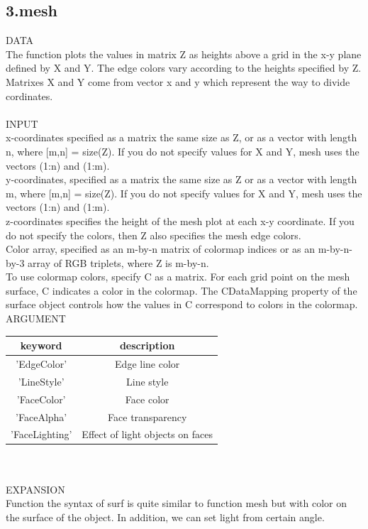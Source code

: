 \documentclass[twoside,a4paper]{article}
\begin{document}
\subsection*{3.mesh}
\Large{DATA}\\
 The function plots the values in matrix Z as heights above a grid in the x-y plane defined by X and Y. The edge colors vary according to the heights specified by Z. Matrixes X and Y come from vector x and y which represent the way to divide cordinates.\\
\\
\Large{INPUT}\\
x-coordinates specified as a matrix the same size as Z, or as a vector with length n, where [m,n] = size(Z). If you do not specify values for X and Y, mesh uses the vectors (1:n) and (1:m).\\
y-coordinates, specified as a matrix the same size as Z or as a vector with length m, where [m,n] = size(Z). If you do not specify values for X and Y, mesh uses the vectors (1:n) and (1:m).\\
z-coordinates specifies the height of the mesh plot at each x-y coordinate. If you do not specify the colors, then Z also specifies the mesh edge colors.\\
Color array, specified as an m-by-n matrix of colormap indices or as an m-by-n-by-3 array of RGB triplets, where Z is m-by-n.\\
To use colormap colors, specify C as a matrix. For each grid point on the mesh surface, C indicates a color in the colormap. The CDataMapping property of the surface object controls how the values in C correspond to colors in the colormap.\\
\Large{ARGUMENT}\\

\begin{tabular}{|c|c|}
\hline
keyword & description \\
\hline
'EdgeColor'  & Edge line color\\
'LineStyle' & Line style \\
'FaceColor'  & Face color\\
'FaceAlpha' & Face transparency\\
'FaceLighting' & Effect of light objects on faces\\
\hline
\end{tabular}\\
\\
\Large{EXPANSION}\\
Function the syntax of surf is quite similar to function mesh but with color on the surface of the object. In addition, we can set light from certain angle.
\end{document}

